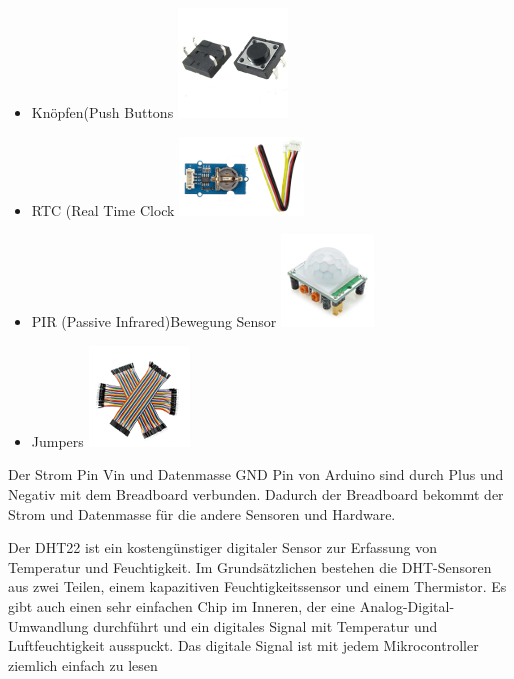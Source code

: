 \documentclass[conference]{IEEEtran}
\begin{document}
\begin{itemize}
\item Knöpfen(Push Buttons	
	\includegraphics[width=0.27\linewidth]{fig20}
	
\item RTC (Real Time Clock
		\includegraphics[width=0.27\linewidth]{fig21}
	
	
\item PIR (Passive Infrared)Bewegung Sensor
	\includegraphics[width=0.27\linewidth]{fig22}
	
\item Jumpers
		\includegraphics[width=0.27\linewidth]{fig23}
\end{itemize}

Der Strom Pin Vin und Datenmasse GND Pin von Arduino sind durch Plus und Negativ mit dem Breadboard verbunden. Dadurch der Breadboard bekommt der Strom und Datenmasse für die andere Sensoren und Hardware.   

Der DHT22 ist ein kostengünstiger digitaler Sensor zur Erfassung von Temperatur und Feuchtigkeit. Im Grundsätzlichen bestehen die DHT-Sensoren aus zwei Teilen, einem kapazitiven Feuchtigkeitssensor und einem Thermistor. Es gibt auch einen sehr einfachen Chip im Inneren, der eine Analog-Digital-Umwandlung durchführt und ein digitales Signal mit Temperatur und Luftfeuchtigkeit ausspuckt. Das digitale Signal ist mit jedem Mikrocontroller ziemlich einfach zu lesen
\end{document}
